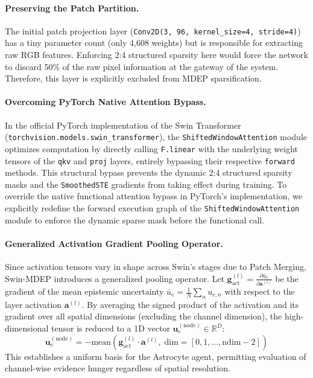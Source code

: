 \documentclass[letterpaper]{article} %
\newcommand{\R}{\mathbb{R}}
\begin{document}
\paragraph{Preserving the Patch Partition.}
The initial patch projection layer (\texttt{Conv2D(3, 96, kernel\_size=4, stride=4)}) has a tiny parameter count (only 4,608 weights) but is responsible for extracting raw RGB features. Enforcing 2:4 structured sparsity here would force the network to discard 50\% of the raw pixel information at the gateway of the system. Therefore, this layer is explicitly excluded from MDEP sparsification.

\paragraph{Overcoming PyTorch Native Attention Bypass.}
In the official PyTorch implementation of the Swin Transformer (\texttt{torchvision.models.swin\_transformer}), the \texttt{ShiftedWindowAttention} module optimizes computation by directly calling \texttt{F.linear} with the underlying weight tensors of the \texttt{qkv} and \texttt{proj} layers, entirely bypassing their respective \texttt{forward} methods. This structural bypass prevents the dynamic 2:4 structured sparsity masks and the \texttt{SmoothedSTE} gradients from taking effect during training. To override the native functional attention bypass in PyTorch's implementation, we explicitly redefine the forward execution graph of the \texttt{ShiftedWindowAttention} module to enforce the dynamic sparse mask before the functional call.

\paragraph{Generalized Activation Gradient Pooling Operator.}
Since activation tensors vary in shape across Swin's stages due to Patch Merging, Swin-MDEP introduces a generalized pooling operator. Let $\bm{g}_{\text{act}}^{(l)} = \frac{\partial \bar{u}_e}{\partial \bm{a}^{(l)}}$ be the gradient of the mean epistemic uncertainty $\bar{u}_e = \frac{1}{N}\sum_n u_{e,n}$ with respect to the layer activation $\bm{a}^{(l)}$. By averaging the signed product of the activation and its gradient over all spatial dimensions (excluding the channel dimension), the high-dimensional tensor is reduced to a 1D vector $\bm{u}_e^{(\text{node})} \in \R^D$:
\begin{equation}\label{eq:activation_pooling}
    \bm{u}_e^{(\text{node})} = - \text{mean}\!\left(\bm{g}_{\text{act}}^{(l)} \cdot \bm{a}^{(l)},\; \text{dim}=[0, 1, \ldots, \text{ndim}-2]\right)
\end{equation}
This establishes a uniform basis for the Astrocyte agent, permitting evaluation of channel-wise evidence hunger regardless of spatial resolution.
\end{document}
